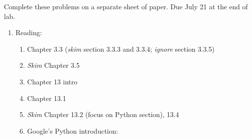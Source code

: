 \documentclass[9pt]{article}
\begin{document}
\noindent Complete these problems on a separate sheet of paper. Due July 21 at
the end of lab.
\begin{enumerate}
   \item Reading:

         \begin{enumerate}
            \item Chapter 3.3 (\textit{skim} section 3.3.3 and 3.3.4;
                  \textit{ignore} section 3.3.5)
            \item \textit{Skim} Chapter 3.5
            \item Chapter 13 intro
            \item Chapter 13.1
            \item \textit{Skim} Chapter 13.2 (focus on Python section), 13.4
            \item Google's Python introduction:


\end{enumerate}
\end{enumerate}
\end{document}
